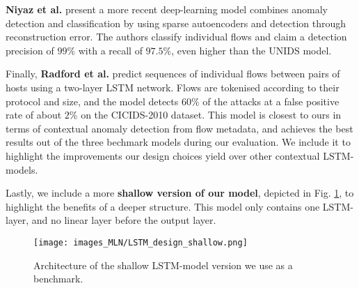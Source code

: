 \textbf{Niyaz et al.} \cite{javaid2016deep} present a more recent deep-learning model combines anomaly detection and classification by using sparse autoencoders and detection through reconstruction error. %
The authors classify individual flows and claim a detection precision of $99\%$ with a recall of $97.5\%$, even higher than the UNIDS model.

Finally, \textbf{Radford et al.} \cite{radford2018network} predict sequences of individual flows between pairs of hosts using a two-layer LSTM network. Flows are tokenised according to their protocol and size, and the model detects $60\%$ of the attacks at a false positive rate of about $2\%$ on the CICIDS-2010 dataset. %
This model is closest to ours in terms of contextual anomaly detection from flow metadata, and achieves the best results out of the three bechmark models during our evaluation. We include it to highlight the improvements our design choices yield over other contextual LSTM-models.



Lastly, we include a more \textbf{shallow version of our model}, depicted in Fig. \ref{fig:rnn_FSA2}, to highlight the benefits of a deeper structure. This model only contains one LSTM-layer, and no linear layer before the output layer. 

\begin{figure}
    \begin{center}
      \texttt{[image: images\_MLN/LSTM\_design\_shallow.png]}
    \end{center}
    \vspace{-15pt}
    \caption{Architecture of the shallow LSTM-model version we use as a benchmark.}\label{fig:rnn_FSA2}
\end{figure}



